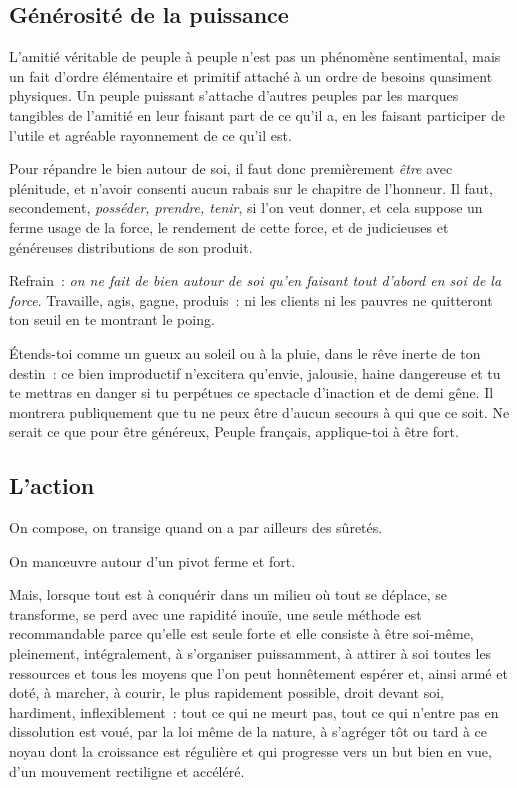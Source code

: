 \documentclass[french,twoside]{book} %
\newcommand{\astermono}{\medskip\centerline{\color{rubric}\large\selectfont{\syms ✻}}\medskip\par}%
\begin{document}
\subsection[Générosité de la puissance]{Générosité de la puissance}
\noindent L’amitié véritable de peuple à peuple n’est pas un phénomène sentimental, mais un fait d’ordre élémentaire et primitif attaché à un ordre de besoins quasiment physiques. Un peuple puissant s’attache d’autres peuples par les marques tangibles de l’amitié en leur faisant part de ce qu’il a, en les faisant participer de l’utile et agréable rayonnement de ce qu’il est.\par
Pour répandre le bien autour de soi, il faut donc premièrement \emph{être} avec plénitude, et n’avoir consenti aucun rabais sur le chapitre de l’honneur. Il faut, secondement, \emph{posséder, prendre, tenir}, si l’on veut donner, et cela suppose un ferme usage de la force, le rendement de cette force, et de judicieuses et généreuses distributions de son produit.\par
Refrain : \emph{on ne fait de bien autour de soi qu’en faisant tout d’abord en soi de la force}. Travaille, agis, gagne, produis : ni les clients ni les pauvres ne quitteront ton seuil en te montrant le poing.\par
Étends-toi comme un gueux au soleil ou à la pluie, dans le rêve inerte de ton destin : ce bien improductif n’excitera qu’envie, jalousie, haine dangereuse et tu te mettras en danger si tu perpétues ce spectacle d’inaction et de demi gêne. Il montrera publiquement que tu ne peux être d’aucun secours à qui que ce soit. Ne serait ce que pour être généreux, Peuple français, applique-toi à être fort.\par

\astermono

\subsection[L’action]{L’action}
\noindent On compose, on transige quand on a par ailleurs des sûretés.\par
On manœuvre autour d’un pivot ferme et fort.\par
Mais, lorsque tout est à conquérir dans un milieu où tout se déplace, se transforme, se perd avec une rapidité inouïe, une seule méthode est recommandable parce qu’elle est seule forte et elle consiste à être soi-même, pleinement, intégralement, à s’organiser puissamment, à attirer à soi toutes les ressources et tous les moyens que l’on peut honnêtement espérer et, ainsi armé et doté, à marcher, à courir, le plus rapidement possible, droit devant soi, hardiment, inflexiblement : tout ce qui ne meurt pas, tout ce qui n’entre pas en dissolution est voué, par la loi même de la nature, à s’agréger tôt ou tard à ce noyau dont la croissance est régulière et qui progresse vers un but bien en vue, d’un mouvement rectiligne et accéléré.
\end{document}
